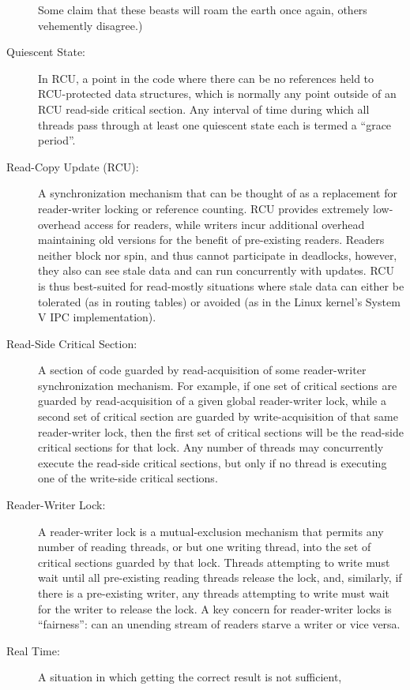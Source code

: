 \begin{description}
	Some claim that these beasts will roam the earth once again,
	others vehemently disagree.)
\item[Quiescent State:]
	In RCU, a point in the code where there can be no references held
	to RCU-protected data structures, which is normally any point
	outside of an RCU read-side critical section.
	Any interval of time during which all threads pass through at
	least one quiescent state each is termed a ``grace period''.
\item[Read-Copy Update (RCU):]
	A synchronization mechanism that can be thought of as a replacement
	for reader-writer locking or reference counting.
	RCU provides extremely low-overhead access for readers, while
	writers incur additional overhead maintaining old versions
	for the benefit of pre-existing readers.
	Readers neither block nor spin, and thus cannot participate in
	deadlocks, however, they also can see stale data and can
	run concurrently with updates.
	RCU is thus best-suited for read-mostly situations where
	stale data can either be tolerated (as in routing tables)
	or avoided (as in the Linux kernel's System V IPC implementation).
\item[Read-Side Critical Section:]
	A section of code guarded by read-acquisition of
	some reader-writer synchronization mechanism.
	For example, if one set of critical sections are guarded by
	read-acquisition of
	a given global reader-writer lock, while a second set of critical
	section are guarded by write-acquisition of that same reader-writer
	lock, then the first set of critical sections will be the
	read-side critical sections for that lock.
	Any number of threads may concurrently execute the read-side
	critical sections, but only if no thread is executing one of
	the write-side critical sections.
\item[Reader-Writer Lock:]
	A reader-writer lock is a mutual-exclusion mechanism that
	permits any number of reading
	threads, or but one writing thread, into the set of critical
	sections guarded by that lock.
	Threads attempting to write must wait until all pre-existing
	reading threads release the lock, and, similarly, if there
	is a pre-existing writer, any threads attempting to write must
	wait for the writer to release the lock.
	A key concern for reader-writer locks is ``fairness'':
	can an unending stream of readers starve a writer or vice versa.
\item[Real Time:]
	A situation in which getting the correct result is not sufficient,

\end{description}
